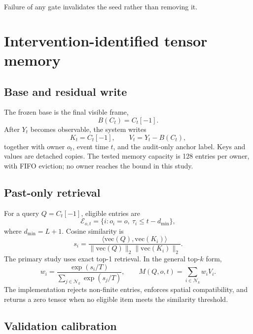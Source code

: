 \documentclass[11pt]{article}
\begin{document}
Failure of any gate invalidates the seed rather than removing it.

\section{Intervention-identified tensor memory}

\subsection{Base and residual write}

The frozen base is the final visible frame,
\begin{equation}
 B(C_t)=C_t[-1].
\end{equation}
After $Y_t$ becomes observable, the system writes
\begin{equation}
 K_t=C_t[-1], \qquad V_t=Y_t-B(C_t),
\end{equation}
together with owner $o_t$, event time $t$, and the audit-only anchor label.
Keys and values are detached copies. The tested memory capacity is 128 entries
per owner, with FIFO eviction; no owner reaches the bound in this study.

\subsection{Past-only retrieval}

For a query $Q=C_t[-1]$, eligible entries are
\begin{equation}
 \mathcal{E}_{o,t}=\{i:o_i=o,\ \tau_i\le t-d_{\min}\},
\end{equation}
where $d_{\min}=L+1$. Cosine similarity is
\begin{equation}
 s_i=\frac{\langle\mathrm{vec}(Q),\mathrm{vec}(K_i)\rangle}
 {\|\mathrm{vec}(Q)\|_2\|\mathrm{vec}(K_i)\|_2}.
\end{equation}
The primary study uses exact top-1 retrieval. In the general top-$k$ form,
\begin{equation}
 w_i=\frac{\exp(s_i/T)}{\sum_{j\in\mathcal{N}_k}\exp(s_j/T)},\qquad
 M(Q,o,t)=\sum_{i\in\mathcal{N}_k}w_iV_i .
\end{equation}
The implementation rejects non-finite entries, enforces spatial compatibility,
and returns a zero tensor when no eligible item meets the similarity threshold.

\subsection{Validation calibration}
\end{document}
